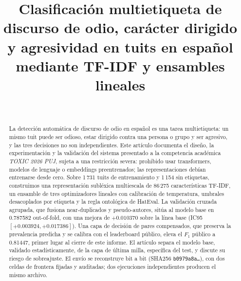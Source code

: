\documentclass[journal]{IEEEtran}
\begin{document}
\title{Clasificación multietiqueta de discurso de odio, carácter dirigido y
agresividad en tuits en español mediante TF-IDF y ensambles lineales}

\author{
\\
}

\maketitle

\begin{abstract}
La detección automática de discurso de odio en español es una tarea
multietiqueta: un mismo tuit puede ser odioso, estar dirigido contra una
persona o grupo y ser agresivo, y las tres decisiones no son independientes.
Este artículo documenta el diseño, la experimentación y la validación del
sistema presentado a la competencia académica \emph{TOXIC 2026 PUJ}, sujeta a
una restricción severa: prohibido usar transformers, modelos de lenguaje o
embeddings preentrenados; las representaciones debían entrenarse desde cero.
Sobre 1\,731 tuits de entrenamiento y 1\,154 sin etiquetas, construimos una
representación subléxica multiescala de 86\,275 características TF-IDF, un
ensamble de tres optimizadores lineales con calibración de temperatura,
umbrales desacoplados por etiqueta y la regla ontológica de HatEval. La
validación cruzada agrupada, que fusiona near-duplicados y pseudo-autores,
sitúa al modelo base en 0.787582 out-of-fold, con una mejora de $+0.010370$
sobre la línea base (IC95 $[+0.003924, +0.017386]$). Una capa de decisión de
pares compensados, que preserva la prevalencia predicha y se calibra con el
leaderboard público, eleva el $F_1$ público a 0.81447, primer lugar al cierre
de este informe. El artículo separa el modelo base, validado estadísticamente,
de la capa de última milla, específica del test, y discute su riesgo de
sobreajuste. El envío se reconstruye bit a bit (SHA256
\texttt{b0979a8a\ldots}), con dos celdas de frontera fijadas y auditadas; dos
ejecuciones independientes producen el mismo archivo.
\end{abstract}
\end{document}
